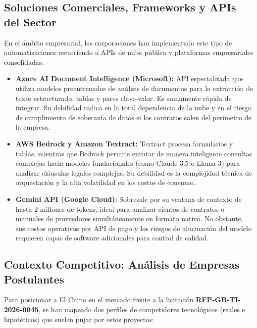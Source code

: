 \documentclass[12pt]{article}
\begin{document}
\subsection{Soluciones Comerciales, Frameworks y APIs del Sector}

En el ámbito empresarial, las corporaciones han implementado este tipo de automatizaciones recurriendo a APIs de nube pública y plataformas empresariales consolidadas:

\begin{itemize}
    \item \textbf{Azure AI Document Intelligence (Microsoft):} API especializada que utiliza modelos preentrenados de análisis de documentos para la extracción de texto estructurado, tablas y pares clave-valor. Es sumamente rápida de integrar. Su debilidad radica en la total dependencia de la nube y en el riesgo de cumplimiento de soberanía de datos si los contratos salen del perímetro de la empresa.

    \item \textbf{AWS Bedrock y Amazon Textract:} Textract procesa formularios y tablas, mientras que Bedrock permite enrutar de manera inteligente consultas complejas hacia modelos fundacionales (como Claude 3.5 o Llama 3) para analizar cláusulas legales complejas. Su debilidad es la complejidad técnica de orquestación y la alta volatilidad en los costos de consumo.

    \item \textbf{Gemini API (Google Cloud):} Sobresale por su ventana de contexto de hasta 2 millones de tokens, ideal para analizar cientos de contratos o manuales de proveedores simultáneamente en formato nativo. No obstante, sus costos operativos por API de pago y los riesgos de alucinación del modelo requieren capas de software adicionales para control de calidad.
\end{itemize}

\subsection{Contexto Competitivo: Análisis de Empresas Postulantes}

Para posicionar a El Cuino en el mercado frente a la licitación \textbf{RFP-GB-TI-2026-0045}, se han mapeado dos perfiles de competidores tecnológicos (reales e hipotéticos) que suelen pujar por estos proyectos:
\end{document}

